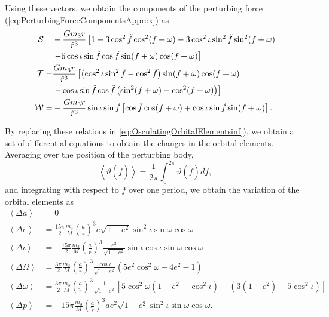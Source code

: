 Using these vectors, we obtain the components of the perturbing force (\ref{eq:PerturbingForceComponentsApprox}) as
\begin{subequations}
 \begin{align}
 \mathcal{S} = &-\frac{Gm_3 r}{\tilde{r}^3} \left[ 1 - 3 \cos^2 \tilde{f} \cos^2 (f+\omega) - 3 \cos^2 \iota \sin^2 \tilde{f} \sin^2 (f+\omega) \right. \notag \\
 &\left. -6 \cos \iota \sin \tilde{f} \cos \tilde{f} \sin (f+\omega) \cos (f+\omega) \right]\\
 \mathcal{T} = &\frac{Gm_3 r}{\tilde{r}^3} \left[ \left( \cos^2 \iota \sin^2 \tilde{f} - \cos^2 \tilde{f} \right) \sin (f+\omega) \cos (f+\omega) \right. \notag \\
 &\left. - \cos \iota \sin \tilde{f} \cos \tilde{f} \left( \sin^2 (f+\omega) -\cos^2 (f+\omega) \right) \right]\\
 \mathcal{W} = &-\frac{Gm_3 r}{\tilde{r}^3} \sin \iota \sin \tilde{f} \left[ \cos \tilde{f} \cos(f+\omega) + \cos \iota \sin \tilde{f} \sin (f+\omega) \right] .
 \end{align}
 \end{subequations} 

By replacing these relations in \ref{eq:OsculatingOrbitalElementsinf}), we obtain a set of differential equations to obtain the changes in the orbital elements. Averaging over the position of the perturbing body,
\begin{equation}
\left\langle \vartheta (\tilde{f} ) \right\rangle = \frac{1}{2 \pi} \int_0^{2\pi} \vartheta (\tilde{f} )  d\tilde{f} ,
\end{equation}
and integrating with respect to $f$ over one period, we obtain the variation of the orbital elements as
\begin{subequations}\label{eq:Kozai-LidovOrbitalElements}
\begin{align}
\left\langle \Delta a \right\rangle &= 0 \\ 
\left\langle \Delta e \right\rangle &= \frac{15 \pi}{2} \frac{m_3}{M} \left( \frac{a}{\tilde{r}}\right)^3 e \sqrt{1-e^2}  \sin^2 \iota \sin \omega \cos \omega \\
\left\langle \Delta \iota \right\rangle &= -\frac{15\pi}{2} \frac{m_3}{M} \left( \frac{a}{\tilde{r}}\right)^3 \frac{e^2}{\sqrt{1-e^2}} \sin \iota \cos \iota \sin \omega \cos \omega \\
\left\langle  \Delta \Omega \right\rangle &= \frac{3\pi}{2} \frac{m_3}{M} \left( \frac{a}{\tilde{r}}\right)^3  \frac{ \cos \iota}{\sqrt{1-e^2}} \left( 5e^2 \cos^2 \omega - 4e^2 -1 \right) \\ 
\left\langle  \Delta \omega \right\rangle &=  \frac{3 \pi}{2} \frac{m_3}{M} \left( \frac{a}{\tilde{r}}\right)^3   \frac{1}{\sqrt{1-e^2}} \left[  5\cos^2 \omega (1-e^2-\cos^2 \iota)- (3(1-e^2) - 5\cos^2 \iota ) \right] \\
\left\langle  \Delta p \right\rangle &= -15 \pi \frac{m_3}{M} \left( \frac{a}{\tilde{r}}\right)^3 a e^2  \sqrt{1-e^2} \sin^2 \iota \sin \omega \cos \omega.
\end{align}
\end{subequations}

